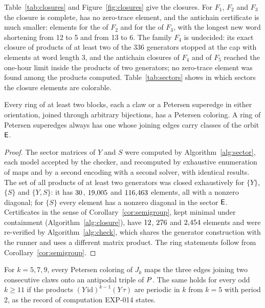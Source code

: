 

Table~\ref{tab:closures} and Figure~\ref{fig:closures} give the closures. For $F_1$, $F_2$ and $F_3$ the closure is complete, has no zero-trace element, and
the antichain certificate is much smaller: \nCertFtwo{} elements for the \nElemFtwo{} of $F_2$ and \nCertFthree{} for the \nElemFthree{} of $F_3$, with the longest new word shortening
from 12 to 5 and from 13 to 6. The family $F_4$ is undecided: its exact closure of products of at least two of the 336 generators stopped at the cap with \nElemFfour{} elements at word length 3,
and the antichain closures of $F_4$ and of $F_5$ reached the one-hour limit inside the products of two generators; no zero-trace element was found among the products computed.
Table~\ref{tab:sectors} shows in which sectors the closure elements are colorable.

\begin{theorem}[\claim{MV}]\label{thm:ringsY}
Every ring of at least two blocks, each a claw or a Petersen superedge in either orientation, joined
through arbitrary bijections, has a Petersen coloring. A ring of Petersen superedges always has one
whose joining edges carry classes of the orbit $\mathsf{E}$.
\end{theorem}

\begin{proof}
The sector matrices of $Y$ and $S$ were computed by Algorithm~\ref{alg:sector}, each model accepted by the checker, and recomputed by exhaustive
enumeration of maps and by a second encoding with a second solver, with identical results. The set
of all products of at least two generators was closed exhaustively for $\{Y\}$, $\{S\}$ and
$\{Y, S\}$: it has $30$, $19{,}005$ and $116{,}463$ elements, all with a nonzero diagonal; for
$\{S\}$ every element has a nonzero diagonal in the sector $\mathsf{E}$. Certificates in the sense of
Corollary~\ref{cor:semigroup}, kept minimal under containment (Algorithm~\ref{alg:closure}), have $12$, $276$ and $2{,}454$
elements and were re-verified by Algorithm~\ref{alg:check}, which shares the generator construction with the runner and uses a different matrix product. The ring statements follow from Corollary~\ref{cor:semigroup}.
\end{proof}

\begin{corollary}[flower snarks, \claim{MV}, \claim{D} for $k = 5, 7, 9$; \claim{C} for larger odd $k$]\label{cor:flower}
For $k = 5, 7, 9$, every Petersen coloring of $J_k$ maps the three edges joining two
consecutive claws onto an antipodal triple of $P$. The same holds for every odd $k \ge 11$ if the products $(Y\,\mathrm{id})^{k-1}(Y\,\tau)$ are periodic in $k$ from $k = 5$ with period 2,
as the record of computation EXP-014 states.
\end{corollary}

